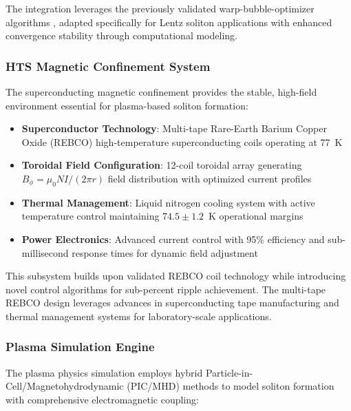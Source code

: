 \documentclass[12pt,a4paper]{article}
\begin{document}
The integration leverages the previously validated warp-bubble-optimizer algorithms \cite{WarpBubble2024}, adapted specifically for Lentz soliton applications with enhanced convergence stability through computational modeling.

\subsubsection{HTS Magnetic Confinement System}

The superconducting magnetic confinement provides the stable, high-field environment essential for plasma-based soliton formation:

\begin{itemize}
\item \textbf{Superconductor Technology}: Multi-tape Rare-Earth Barium Copper Oxide (REBCO) high-temperature superconducting coils operating at 77~K
\item \textbf{Toroidal Field Configuration}: 12-coil toroidal array generating $B_\phi = \mu_0 NI/(2\pi r)$ field distribution with optimized current profiles
\item \textbf{Thermal Management}: Liquid nitrogen cooling system with active temperature control maintaining $74.5 \pm 1.2$~K operational margins
\item \textbf{Power Electronics}: Advanced current control with 95\% efficiency and sub-millisecond response times for dynamic field adjustment
\end{itemize}

This subsystem builds upon validated REBCO coil technology \cite{HTS2024,HTS_Review2022} while introducing novel control algorithms for sub-percent ripple achievement. The multi-tape REBCO design leverages advances in superconducting tape manufacturing \cite{MagneticConfinement2021} and thermal management systems \cite{PlasmaPhysics2023} for laboratory-scale applications.

\subsubsection{Plasma Simulation Engine}

The plasma physics simulation employs hybrid Particle-in-Cell/Magnetohydrodynamic (PIC/MHD) methods to model soliton formation with comprehensive electromagnetic coupling:
\end{document}
